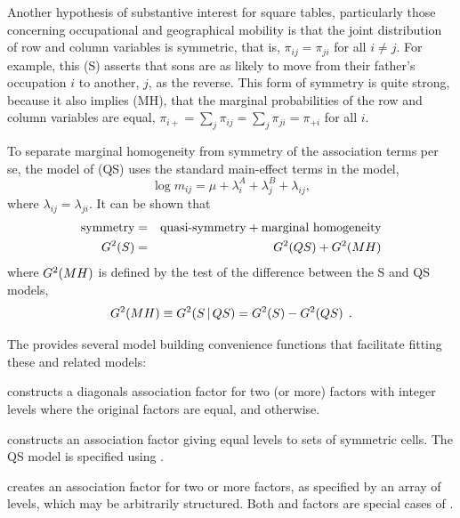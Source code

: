 \documentclass[11pt]{book}\usepackage[]{graphicx}\usepackage[]{color}
\begin{document}
Another hypothesis of substantive interest for square tables,
particularly those concerning occupational and geographical
mobility is that the joint distribution of row and column
variables is symmetric, that is,
$\pi_{ij} = \pi_{ji}$ for all $i \ne j$.
For example, this  (S)
asserts that sons are as likely to
move from their father's occupation $i$ to another, $j$,
as the reverse.
This form of symmetry is quite strong, because it also implies
 (MH),
that the marginal probabilities of the row and column variables
are equal,
$\pi_{i+} = \sum_j \pi_{ij} = \sum_j \pi_{ji} = \pi_{+i}$
for all $i$.

To separate marginal homogeneity from symmetry of the association terms
per se, the model of  (QS)
uses the standard
main-effect terms in the \loglin model,
\begin{equation}\label{eq:quasi-symm}
 \log m_{ij} = \mu + \lambda_i^A + \lambda_j^B + \lambda_{ij}
 \comma
\end{equation}
where $\lambda_{ij} = \lambda_{ji}$.  It can be shown \citep{caus:1966} that
\begin{eqnarray*}
\mbox{symmetry} & = & \mbox{quasi-symmetry} + \mbox{marginal homogeneity} \\
      G^2 (S)  & = & G^2 (QS) + G^2 (MH)
\end{eqnarray*}
where $G^2 (MH)$ is defined by the \LR test of the difference between the
S and QS models,
\begin{equation}\label{eq:mh}
G^2 (MH) \equiv G^2 (S \, | \, QS) =  G^2 (S) - G^2 (QS) \:\: .
\end{equation}

The  provides several model building convenience functions that
facilitate fitting these and related models:
\begin{itemize*}
 \item {} constructs a diagonals association
 factor for two (or more)
 factors with integer levels where the original factors are equal, and  otherwise.
 \item {} constructs an association
 factor giving equal levels to
 sets of symmetric cells.  The QS model is specified using .
 \item {} creates an association factor for two or more
 factors, as specified by an array of levels, which may be arbitrarily structured.
 Both  and  factors are special cases of .
\end{itemize*}
\end{document}

